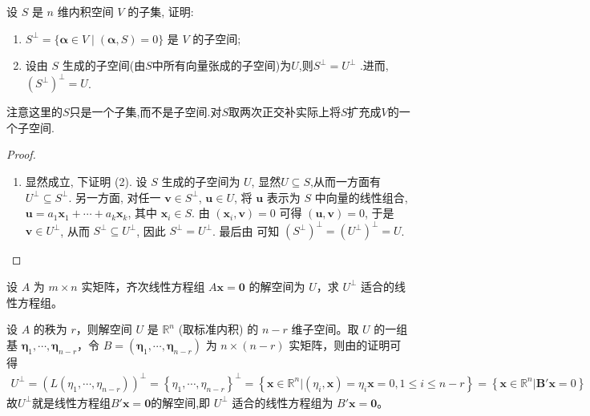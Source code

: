 \documentclass[../../main.tex]{subfiles}
\begin{document}
\begin{proposition}\label{proposition:例9.19}
设 $S$ 是 $n$ 维内积空间 $V$ 的子集, 证明:
\begin{enumerate}[(1)]
\item $S^\perp = \{ \boldsymbol{\alpha} \in V \mid (\boldsymbol{\alpha}, S) = 0\}$ 是 $V$ 的子空间;
\item 设由 $S$ 生成的子空间(由$S$中所有向量张成的子空间)为$U$,则$S^\perp=U^\perp$ .进而,$(S^\perp)^\perp=U$.
\end{enumerate}
\end{proposition}
\begin{remark}
注意这里的$S$只是一个子集,而不是子空间.对$S$取两次正交补实际上将$S$扩充成$V$的一个子空间.
\end{remark}
\begin{proof}
\begin{enumerate}[(1)]
\item 显然成立, 下证明 (2). 设 $S$ 生成的子空间为 $U$, 显然$U\subseteq S$,从而一方面有 $U^\perp \subseteq S^\perp$. 另一方面, 对任一 $\boldsymbol{v} \in S^\perp$, $\boldsymbol{u} \in U$, 将 $\boldsymbol{u}$ 表示为 $S$ 中向量的线性组合, $\boldsymbol{u} = a_1\boldsymbol{x}_1 + \cdots + a_k\boldsymbol{x}_k$, 其中 $\boldsymbol{x}_i \in S$. 由 $(\boldsymbol{x}_i, \boldsymbol{v}) = 0$ 可得 $(\boldsymbol{u}, \boldsymbol{v}) = 0$, 于是 $\boldsymbol{v} \in U^\perp$, 从而 $S^\perp \subseteq U^\perp$, 因此 $S^\perp = U^\perp$. 最后由 可知 $(S^\perp)^\perp = (U^\perp)^\perp = U$. 
\end{enumerate} 
\end{proof}

\begin{proposition}\label{proposition:例9.20}
设 $A$ 为 $m \times n$ 实矩阵，齐次线性方程组 $A\boldsymbol{x} = \boldsymbol{0}$ 的解空间为 $U$，求 $U^{\perp}$ 适合的线性方程组。
\end{proposition}
\begin{solution}
设 $A$ 的秩为 $r$，则解空间 $U$ 是 $\mathbb{R}^n$ (取标准内积) 的 $n - r$ 维子空间。取 $U$ 的一组基 $\boldsymbol{\eta}_1, \cdots, \boldsymbol{\eta}_{n - r}$，令 $B = (\boldsymbol{\eta}_1, \cdots, \boldsymbol{\eta}_{n - r})$ 为 $n \times (n - r)$ 实矩阵，则由的证明可得
\begin{align*}
U^{\bot}=\left( L\left( \eta _1,\cdots ,\eta _{n-r} \right) \right) ^{\bot}=\left\{ \eta _1,\cdots ,\eta _{n-r} \right\} ^{\bot}=\left\{ \boldsymbol{x}\in \mathbb{R} ^n|\left( \eta _i,\boldsymbol{x} \right) =\eta _i\boldsymbol{x}=0,1\le i\le n-r \right\} =\left\{ \boldsymbol{x}\in \mathbb{R} ^n|\boldsymbol{B}' \boldsymbol{x}=0 \right\} 
\end{align*}
故$U^{\perp}$就是线性方程组$B'\boldsymbol{x} = \boldsymbol{0}$的解空间,即 $U^{\perp}$ 适合的线性方程组为 $B'\boldsymbol{x} = \boldsymbol{0}$。
\end{solution}
\end{document}
